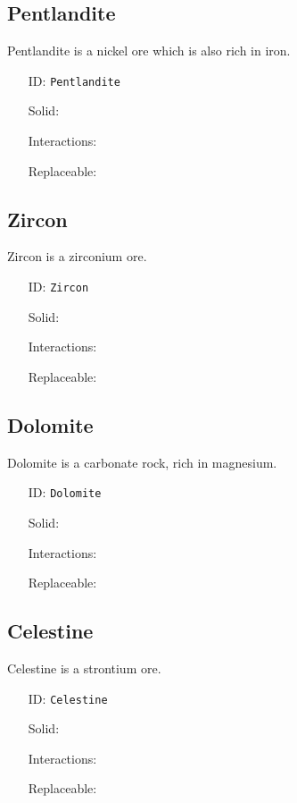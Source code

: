 \subsection{Pentlandite}\label{subsec:blocks_pentlandite}
Pentlandite is a nickel ore which is also rich in iron.
\newline
\begin{itemize}[nosep]
\item[ID:] \texttt{Pentlandite}
\item[Solid:]  \Checkmark \item[Interactions:]  \XSolidBrush \item[Replaceable:]  \XSolidBrush \end{itemize}

\subsection{Zircon}\label{subsec:blocks_zircon}
Zircon is a zirconium ore.
\newline
\begin{itemize}[nosep]
\item[ID:] \texttt{Zircon}
\item[Solid:]  \Checkmark \item[Interactions:]  \XSolidBrush \item[Replaceable:]  \XSolidBrush \end{itemize}

\subsection{Dolomite}\label{subsec:blocks_dolomite}
Dolomite is a carbonate rock, rich in magnesium.
\newline
\begin{itemize}[nosep]
\item[ID:] \texttt{Dolomite}
\item[Solid:]  \Checkmark \item[Interactions:]  \XSolidBrush \item[Replaceable:]  \XSolidBrush \end{itemize}

\subsection{Celestine}\label{subsec:blocks_celestine}
Celestine is a strontium ore.
\newline
\begin{itemize}[nosep]
\item[ID:] \texttt{Celestine}
\item[Solid:]  \Checkmark \item[Interactions:]  \XSolidBrush \item[Replaceable:]  \XSolidBrush \end{itemize}

